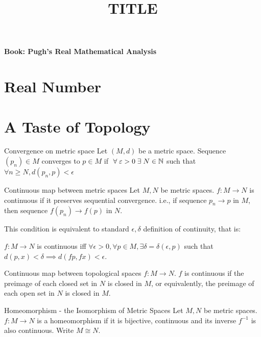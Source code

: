 \documentclass[a4paper, 10pt]{article}
\title{TITLE}
\begin{document}
\textbf{Book: Pugh's Real Mathematical Analysis}
\section{Real Number}
\section{A Taste of Topology}
\begin{definition} {Convergence on metric space}
    Let $(M, d)$ be a metric space. Sequence $(p_n) \in M$ converges to $p \in M$ if $\forall \epsilon > 0 \exists N \in \bbn$ such that $\forall n \geq N, d(p_n, p) < \epsilon$
\end{definition}

\begin{definition} {Continuous map between metric spaces}
    Let $M, N$ be metric spaces. $f: M \to N$ is continuous if it preserves sequential convergence. i.e., if sequence $p_n \to p$ in $M$, then sequence $f(p_n) \to f(p)$ in $N$.

    This condition is equivalent to standard $\epsilon, \delta$ definition of continuity, that is:

    $f: M \to N$ is continuous iff $\forall \epsilon > 0, \forall p \in M, \exists \delta = \delta(\epsilon, p)$ such that $d(p, x) < \delta \implies d(fp, fx) < \epsilon$.
\end{definition}

\begin{definition} {Continuous map between topological spaces}
    $f: M \to N$. $f$ is continuous if the preimage of each closed set in $N$ is closed in $M$, or equivalently, the preimage of each open set in $N$ is closed in $M$.
\end{definition}

\begin{definition} {Homeomorphism - the Isomorphism of Metric Spaces}
Let $M, N$ be metric spaces. $f: M \to N$ is a homeomorphism if it is bijective, continuous and its inverse $f^{-1}$ is also continuous. Write $M \cong N$.
\end{definition}
\end{document}
